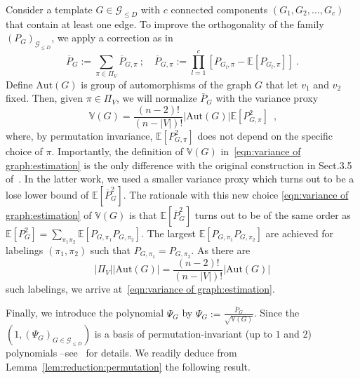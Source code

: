 \documentclass[final]{colt2026}
\newcommand{\1}{\mathbf{1}}
\begin{document}
Consider a template $G\in \mathcal{G}_{\leq D}$ with $c$ connected components $(G_1,G_2,\ldots, G_c)$ that contain at least one edge. To improve the orthogonality of the family $(P_{G})_{\mathcal{G}_{\leq D}}$,  
we apply a correction as in \cite{CGGV25}
\begin{equation*} 
\overline{P}_{G} := \sum_{\pi\in \Pi_V} \overline{P}_{G,\pi} \ ; \quad  \overline{P}_{G,\pi}:=\prod_{l=1}^c \left[P_{G_l,\pi} - \mathbb{E}[P_{G_l,\pi} ]\right] \ . 
\end{equation*}
Define $\mathrm{Aut}(G)$ is group of automorphisms of the graph $G$ that let $v_1$ and $v_2$ fixed. Then, given $\pi\in \Pi_V$, we will normalize $\bar P_{G}$ with the 
 variance proxy
\begin{equation}~\label{eqn:variance of graph:estimation}
\mathbb V(G) = \frac{(n-2)!}{(n-|V|)!} |\mathrm{Aut}(G)|  \mathbb E[P_{G,\pi}^2]\enspace ,
\end{equation}
where, by permutation invariance, $\mathbb E[P_{G,\pi}^2]$ does not depend on the specific choice of $\pi$. 
Importantly, the definition of $\mathbb V(G)$ in~\eqref{eqn:variance of graph:estimation} is the only difference with the original construction in Sect.3.5 of~\cite{CGGV25}. In the latter work, we used a smaller variance proxy which turns out to be a lose lower bound of $\mathbb{E}[\overline{P}^2_G]$. The rationale with this new choice \eqref{eqn:variance of graph:estimation} of  $\mathbb V(G)$ is that $\mathbb{E}[\overline{P}^2_G]$ turns out to be of the same order as $\mathbb{E}[P^2_G]= \sum_{\pi_1\pi_2}\mathbb{E}[P_{G,\pi_1}P_{G,\pi_2}]$. The largest $\mathbb{E}[P_{G,\pi_1}P_{G,\pi_2}]$ are achieved for labelings $(\pi_1,\pi_2)$ such that $P_{G,\pi_1}= P_{G,\pi_2}$. As there are 
\begin{equation}\label{eq:card-label}
|\Pi_V||\mathrm{Aut}(G)|= \frac{(n-2)!}{(n-|V|)!} |\mathrm{Aut}(G)| 
\end{equation} such labelings, we arrive at~\eqref{eqn:variance of graph:estimation}. 




Finally, we introduce the polynomial $\Psi_G$ by $\Psi_{G} := \frac{\overline{P}_G}{\sqrt{\mathbb V(G)}}$. Since the $(1,(\Psi_G)_{G\in \mathcal{G}_{\leq D}})$ is a basis of permutation-invariant (up to $1$ and $2$) polynomials --see~\cite{CGGV25} for details. We readily deduce from Lemma~\ref{lem:reduction:permutation} the following result. 
\end{document}
